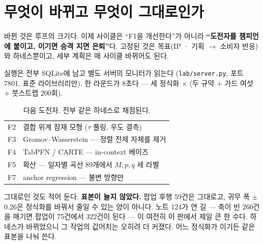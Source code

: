 \documentclass[10pt]{article}
\begin{document}
\section{무엇이 바뀌고 무엇이 그대로인가}

바뀐 것은 루프의 크기다. 이제 사이클은 ``F1을 개선한다''가 아니라
\textbf{``도전자를 챔피언에 붙이고, 이기면 승격 지면 은퇴''}다. 고정된 것은
목표(IP · 기획 $\to$ 소비자 반응)와 하네스뿐이고, 세부 계획은 매 사이클
바뀌어도 된다.

실행은 전부 SQLite에 남고 별도 서버의 모니터가 읽는다
(\texttt{lab/server.py}, 포트 7801, 표준 라이브러리만). 한 라운드가 8초다
--- 세 정식화 $\times$ (두 규약 $+$ 가드 여섯 $+$ 붓스트랩 200회).

\begin{table}[t]
\centering\tsize
\caption{다음 도전자. 전부 같은 하네스로 채점된다.}
\begin{tabular}{ll}
\toprule
F2 & 결합 위계 잠재 모형 ($\tau$ 풀링, 우도 결측) \\
F3 & Gromov--Wasserstein --- 정렬 전제 자체를 제거 \\
F4 & TabPFN / CARTE --- in-context 베이즈 \\
F5 & 확산 --- 일자별 곡선 89개에서 $M,p,q$ 세 라벨 \\
F7 & anchor regression --- 불변 방향만 \\
\bottomrule
\end{tabular}
\end{table}

그대로인 것도 적어 둔다. \textbf{표본이 늘지 않았다.} 팝업 후행 59건은
그대로고, 귀무 폭 $\pm$0.26은 정식화를 바꿔서 줄일 수 있는 양이 아니다.
노트 124가 연 길 --- 축이 빈 260건을 매기면 팝업이 75건에서 322건이 된다
--- 이 여전히 이 판에서 제일 큰 한 수다. 하네스가 바뀌었으니 그 작업의
값어치는 오히려 더 커졌다. 어느 정식화가 이기든 같은 표본을 나눠 쓴다.
\end{document}
